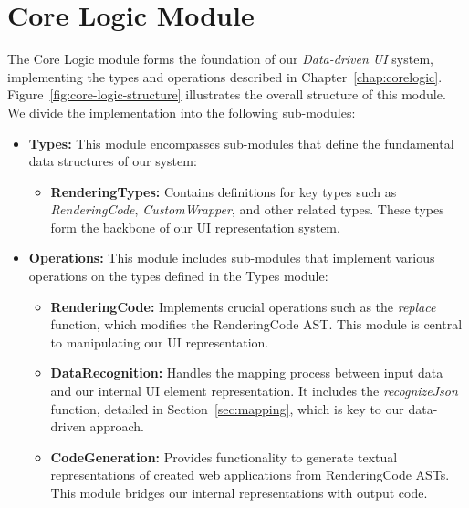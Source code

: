 \section{Core Logic Module}
The Core Logic module forms the foundation of our \emph{Data-driven UI} system, implementing the types and operations described in Chapter~\ref{chap:corelogic}.
Figure~\ref{fig:core-logic-structure} illustrates the overall structure of this module.
We divide the implementation into the following sub-modules:
\begin{itemize}
	\item \textbf{Types:} This module encompasses sub-modules that define the fundamental data structures of our system:
	      \begin{itemize}
		      \item \textbf{RenderingTypes:} Contains definitions for key types such as \emph{RenderingCode}, \emph{CustomWrapper}, and other related types.
		            These types form the backbone of our UI representation system.
	      \end{itemize}

	\item \textbf{Operations:} This module includes sub-modules that implement various operations on the types defined in the Types module:
	      \begin{itemize}
		      \item \textbf{RenderingCode:} Implements crucial operations such as the \emph{replace} function, which modifies the RenderingCode AST.
		            This module is central to manipulating our UI representation.

		      \item \textbf{DataRecognition:}  Handles the mapping process between input data and our internal UI element representation.
		            It includes the \emph{recognizeJson} function, detailed in Section~\ref{sec:mapping}, which is key to our data-driven approach.

		      \item\textbf{CodeGeneration:} Provides functionality to generate textual representations of created web applications from RenderingCode ASTs.
		            This module bridges our internal representations with output code.
	      \end{itemize}
\end{itemize}


